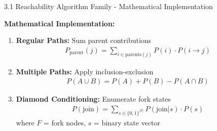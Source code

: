 \documentclass[aspectratio=169]{beamer}
\begin{document}
\begin{frame}{\textcolor{juliapurple}{3.1  Reachability Algorithm Family  - Mathematical Implementation}}

\textbf{\textcolor{juliagreen}{Mathematical Implementation:}}
\begin{enumerate}
    \item \textbf{Regular Paths:} Sum parent contributions
    \begin{align}
    P_{\text{parent}}(j) = \sum_{i \in \text{parents}(j)} P(i) \cdot P(i \to j)
    \end{align}
    
    \item \textbf{Multiple Paths:} Apply inclusion-exclusion  
    \begin{align}
    P(A \cup B) = P(A) + P(B) - P(A \cap B)
    \end{align}
    
    \item \textbf{Diamond Conditioning:} Enumerate fork states
    \begin{align}
    P(\text{join}) = \sum_{s \in \{0,1\}^{|F|}} P(\text{join}|s) \cdot P(s)
    \end{align}
    where $F$ = fork nodes, $s$ = binary state vector
    
\end{enumerate}



\end{frame}
\end{document}
